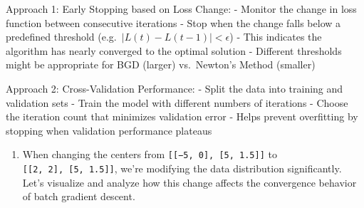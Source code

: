 \documentclass[11pt]{article}
\providecommand{\tightlist}{%
      \setlength{\itemsep}{0pt}\setlength{\parskip}{0pt}}
\begin{document}
Approach 1: Early Stopping based on Loss Change: - Monitor the change in
loss function between consecutive iterations - Stop when the change
falls below a predefined threshold (e.g.~\(|L(t) - L(t-1)| < \epsilon\))
- This indicates the algorithm has nearly converged to the optimal
solution - Different thresholds might be appropriate for BGD (larger)
vs.~Newton's Method (smaller)

Approach 2: Cross-Validation Performance: - Split the data into training
and validation sets - Train the model with different numbers of
iterations - Choose the iteration count that minimizes validation error
- Helps prevent overfitting by stopping when validation performance
plateaus

    \begin{enumerate}
\def\labelenumi{\arabic{enumi}.}
\setcounter{enumi}{6}
\tightlist
\item
  When changing the centers from
  \texttt{{[}{[}−5,\ 0{]},\ {[}5,\ 1.5{]}{]}} to
  \texttt{{[}{[}2,\ 2{]},\ {[}5,\ 1.5{]}{]}}, we're modifying the data
  distribution significantly. Let's visualize and analyze how this
  change affects the convergence behavior of batch gradient descent.
\end{enumerate}
\end{document}

